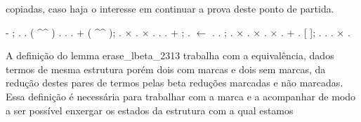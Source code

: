 copiadas, caso haja o interesse em continuar a prova deste ponto de partida.\begin{coqdoccode}
\coqdocemptyline
\coqdocindent{1.00em}
-  ; .\coqdoceol
\coqdocindent{2.00em}
   .\coqdoceol
\coqdocindent{2.00em}
 ( \^{}\^{} )  .\coqdoceol
\coqdocindent{2.00em}
   .\coqdoceol
\coqdocindent{2.00em}
 .\coqdoceol
\coqdocindent{2.00em}
+ \coqdoctac{\ensuremath{\exists}} ( \^{}\^{} ); .\coqdoceol
\coqdocindent{3.00em}
\ensuremath{\times}  .\coqdoceol
\coqdocindent{3.00em}
\ensuremath{\times}  .\coqdoceol
\coqdocindent{4.00em}
 .\coqdoceol
\coqdocindent{4.00em}
.\coqdoceol
\coqdocindent{2.00em}
+  ; .\coqdoceol
\coqdocindent{3.00em}
 \ensuremath{\leftarrow}   .\coqdoceol
\coqdocindent{3.00em}
   .\coqdoceol
\coqdocemptyline
\coqdocindent{3.00em}
 ; .\coqdoceol
\coqdocindent{3.00em}
\ensuremath{\times} .\coqdoceol
\coqdocindent{3.00em}
\ensuremath{\times} .\coqdoceol
\coqdocindent{3.00em}
\ensuremath{\times} .\coqdoceol
\coqdocindent{2.00em}
+ \coqdoceol
\coqdocindent{3.00em}
   .\coqdoceol
\coqdocindent{3.00em}
   [ ]; .\coqdoceol
\coqdocindent{3.00em}
  .\coqdoceol
\coqdocindent{3.00em}
 .\coqdoceol
\coqdocindent{3.00em}
\ensuremath{\times} .\coqdoceol
\coqdocemptyline
\coqdocemptyline
\end{coqdoccode}
A definição do lemma erase\_lbeta\_2313 trabalha com a equivalência, dados termos de mesma estrutura porém dois com
marcas e dois sem marcas, da redução destes pares de termos pelas beta reduções marcadas e não marcadas. Essa definição é
necessária para trabalhar com a marca e a acompanhar de modo a ser possível enxergar os estados da estrutura com a qual estamos
